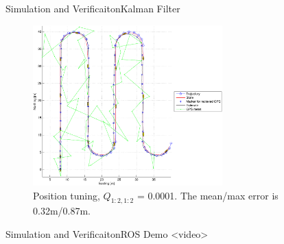 \documentclass[10pt,handout]{beamer}
\begin{document}
\begin{frame}{Simulation and Verificaiton}{Kalman Filter}
  \begin{figure}
    \includegraphics[width=0.65\textwidth]{../../code/matlab/q0,0001}
    \caption{\scriptsize Position tuning, $Q_{1:2,1:2}$ = 0.0001. The mean/max error is 0.32m/0.87m.}
    \label{fig:q0.0001}
  \end{figure}
\end{frame}



\begin{frame}{Simulation and Verificaiton}{ROS Demo}
<video>
\end{frame}

\end{document}
